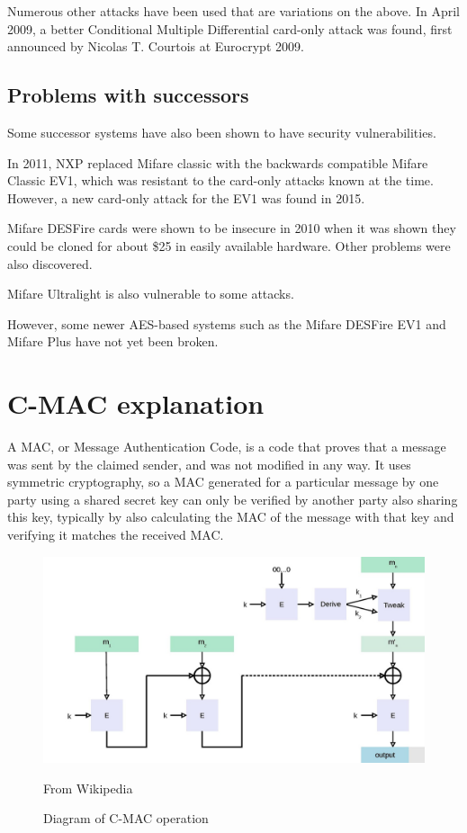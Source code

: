 \documentclass[12pt,a4paper]{article}
\begin{document}
Numerous other attacks have been used that are variations on the above. In April 2009, a better Conditional Multiple Differential card-only attack was found, first announced by Nicolas T. Courtois at Eurocrypt 2009.

\subsection{Problems with successors}
Some successor systems have also been shown to have security vulnerabilities.

In 2011, NXP replaced Mifare classic with the backwards compatible Mifare Classic EV1, which was resistant to the card-only attacks known at the time. However, a new card-only attack for the EV1 was found in 2015.

Mifare DESFire cards were shown to be insecure in 2010 when it was shown they could be cloned for about \$25 in easily available hardware. Other problems were also discovered.

Mifare Ultralight is also vulnerable to some attacks.

However, some newer AES-based systems such as the Mifare DESFire EV1 and Mifare Plus have not yet been broken.


\section{C-MAC explanation}
\label{cmac_expl}
A MAC, or Message Authentication Code, is a code that proves that a message was sent by the claimed sender, and was not modified in any way. It uses symmetric cryptography, so a MAC generated for a particular message by one party using a shared secret key can only be verified by another party also sharing this key, typically by also calculating the MAC of the message with that key and verifying it matches the received MAC.

\begin{figure} [ht]
	\centering
	\includegraphics[scale=0.5]{implementation/CMAC}
	\caption{Diagram of C-MAC operation}
	From Wikipedia \cite{TODO}
\end{figure}
\end{document}
